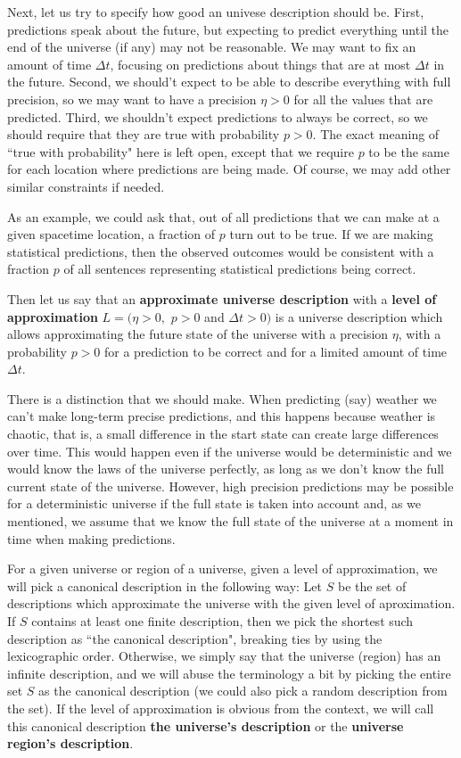 \documentclass[a4paper
]{article}
\newcommand{\definitie}[1]{\textbf{#1}}
\newcommand{\ghilimele}[1]{``#1"}
\begin{document}
Next, let us try to specify how good an univese description
should be. First, predictions speak about the future, but expecting to
predict everything until the end of the universe (if any) may not be
reasonable. We may want to fix an amount of time $\Delta t$,
focusing on predictions about things that are at most
$\Delta t$ in the future. Second, we should't expect to
be able to describe everything with full precision, so we may want to
have a precision $\eta>0$ for all the values that are predicted.
Third, we shouldn't expect predictions to always be correct, so
we should require that they are true with probability $p>0$.
The exact meaning of \ghilimele{true with probability} here is left open,
except that we require $p$ to be the same for each location where
predictions are being made.
Of course, we may add other similar constraints if needed.

As an example, we could ask that, out of all predictions that we can make
at a given spacetime location, a fraction of $p$ turn out to be true.
If we are making
statistical predictions, then the observed outcomes would be consistent
with a fraction $p$ of all sentences representing statistical predictions
being correct.

Then let us say that an \definitie{approximate universe description} with a
\definitie{level of approximation} $L=(\eta>0,$ $p>0$ and $\Delta t>0)$
is a universe description which allows approximating the future
state of the universe with a precision $\eta$, with a probability
$p>0$ for a prediction to be correct
and for a limited amount of time $\Delta t$.

There is a distinction that we should make.
When predicting (say) weather we can't make long-term precise predictions,
and this happens because weather is chaotic, that is, a small difference
in the start state can create large differences over time.
This would happen even if the universe would be deterministic
and we would know the laws of the universe perfectly, as long as we don't know
the full current state of the universe.
However, high precision predictions may be possible for a deterministic
universe if the full state
is taken into account and, as we mentioned, we assume that we know the full
state of the universe at a moment in time when making predictions.

For a given universe or region of a universe,
given a level of approximation, we will pick a canonical description
in the following way: Let $S$ be the set of descriptions which approximate
the universe with the given level of aproximation. If $S$ contains
at least one finite description, then we pick the shortest such
description as \ghilimele{the canonical description}, breaking ties by
using the lexicographic order. Otherwise, we simply say that the
universe (region) has an infinite description, and we will abuse the
terminology a bit by picking the entire set
$S$ as the canonical description (we could
also pick a random description from the set).
If the level of approximation is obvious from the context, we will call
this canonical description \definitie{the universe's description}
or the \definitie{universe region's description}.
\end{document}
